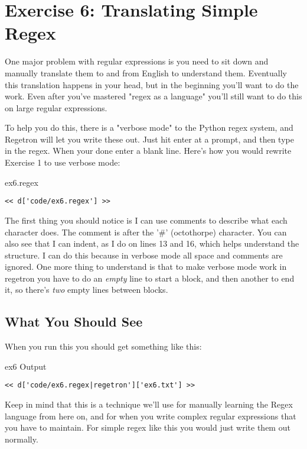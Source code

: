 \chapter{Exercise 6: Translating Simple Regex}

One major problem with regular expressions is you need to sit down
and manually translate them to and from English to understand them.  Eventually
this translation happens in your head, but in the beginning you'll
want to do the work.  Even after you've mastered "regex as a language"
you'll still want to do this on large regular expressions.

To help you do this, there is a "verbose mode" to the Python regex system, and
Regetron will let you write these out.  Just hit enter at a prompt, and then
type in the regex.  When your done enter a blank line.  Here's how you would
rewrite Exercise 1 to use verbose mode:

\begin{code}{ex6.regex}
\begin{Verbatim}
<< d['code/ex6.regex'] >>
\end{Verbatim}
\end{code}

The first thing you should notice is I can use comments to describe what
each character does.  The comment is after the '\#' (octothorpe) character.
You can also see that I can indent, as I do on lines 13 and 16, which helps
understand the structure.  I can do this because in verbose mode all
space and comments are ignored.  One more thing to understand is that to
make verbose mode work in regetron you have to do an \emph{empty} line
to start a block, and then another to end it, so there's \emph{two}
empty lines between blocks.

\section{What You Should See}

When you run this you should get something like this:

\begin{code}{ex6 Output}
\begin{Verbatim}
<< d['code/ex6.regex|regetron']['ex6.txt'] >>
\end{Verbatim}
\end{code}

Keep in mind that this is a technique we'll use for manually learning the
Regex language from here on, and for when you write complex regular
expressions that you have to maintain.  For simple regex like
this you would just write them out normally.

